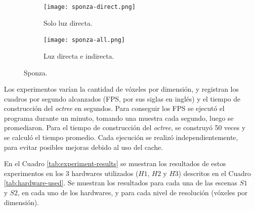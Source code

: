 \begin{figure}[H]
	\begin{subfigure}{0.49\textwidth}
	  \centering
	  \texttt{[image: sponza-direct.png]}
	  \caption{Solo luz directa.}
	\end{subfigure}
	\begin{subfigure}{0.49\textwidth}
	  \centering
	  \texttt{[image: sponza-all.png]}
	  \caption{Luz directa e indirecta.}
	\end{subfigure}
	\caption{Sponza.}
	\label{fig:sponza}
\end{figure}

Los experimentos varían la cantidad de vóxeles por dimensión, y registran los cuadros por segundo alcanzados (FPS, por sus siglas en inglés) y el tiempo de construcción del \textit{octree} en segundos.
Para conseguir los FPS se ejecutó el programa durante un minuto, tomando una muestra cada segundo, luego se promediaron.
Para el tiempo de construcción del \textit{octree}, se construyó 50 veces y se calculó el tiempo promedio.
Cada ejecución se realizó independientemente, para evitar posibles mejoras debido al uso del cache.

En el Cuadro \ref{tab:experiment-results} se muestran los resultados de estos experimentos en los 3 hardwares utilizados ($H1$, $H2$ y $H3$) descritos en el Cuadro \ref{tab:hardware-used}.
Se muestran los resultados para cada una de las escenas $S1$ y $S2$, en cada uno de los hardwares, y para cada nivel de resolución (vóxeles por dimensión).

